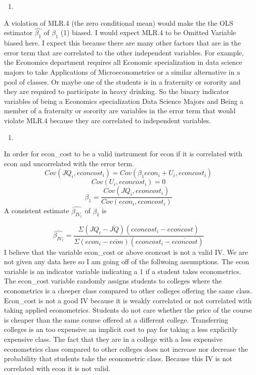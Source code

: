 \documentclass[
  12pt,
  landscape]{article}
\begin{document}
\begin{enumerate}
\def\labelenumi{(\alph{enumi})}
\setcounter{enumi}{2}
\item
\end{enumerate}

A violation of MLR.4 (the zero conditional mean) would make the the OLS
estimator \(\hat{\beta_1}\) of \(\beta_1\) (1) biased. I would expect
MLR.4 to be Omitted Variable biased here. I expect this because there
are many other factors that are in the error term that are correlated to
the other independent variables. For example, the Economics department
requires all Economic specialization in data science majors to take
Applications of Microeconometrics or a similar alternative in a pool of
classes. Or maybe one of the students is in a fraternity or sorority and
they are required to participate in heavy drinking. So the binary
indicator variables of being a Economics specialization Data Science
Majors and Being a member of a fraternity or sorority are variables in
the error term that would violate MLR.4 because they are correlated to
independent variables.

\begin{enumerate}
\def\labelenumi{(\alph{enumi})}
\setcounter{enumi}{3}
\item
\end{enumerate}

In order for econ\_cost to be a valid instrument for econ if it is
correlated with econ and uncorrelated with the error term. \[
Cov(JQ_i, econcost_i) = Cov(\beta_1econ_i+U_i,econcost_i)
\] \[
Cov(U_i,econcost_i) = 0
\] \[
\beta_1 = \frac{Cov(JQ_i, econcost_i)}{Cov(econ_i, econcost_i)}
\] A consistent estimate \(\hat{\beta_{IV_1}}\) of \(\beta_1\) is

\[
\hat{\beta_{IV_1}} = \frac{\Sigma(JQ_i-\bar{JQ})(econcost_i-\bar{econcost})}{\Sigma(econ_i-\bar{econ})(econcost_i-\bar{econcost})}
\] I believe that the variable econ\_cost or above econcost is not a
valid IV. We are not given any data here so I am going off of the
follwoing assumptions. The econ variable is an indicator variable
indicating a 1 if a student takes econometrics. The econ\_cost variable
randomly assigns students to colleges where the econometrics is a
cheeper class compared to other colleges offering the same class.
Econ\_cost is not a good IV because it is weakly correlated or not
correlated with taking applied econometrics. Students do not care
whether the price of the course is cheaper than the same course offered
at a different college. Transferring colleges is an too expensive an
implicit cost to pay for taking a less explicitly expensive class. The
fact that they are in a college with a less expensive econometrics class
compared to other colleges does not increase nor decrease the
probability that students take the econometric class. Because this IV is
not correlated with econ it is not valid.
\end{document}
